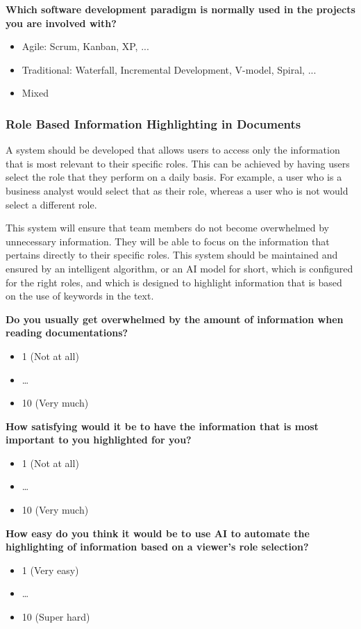 \textbf{Which software development paradigm is normally used in the projects you are involved with?}
\begin{itemize}
    \item Agile: Scrum, Kanban, XP, ...
    \item Traditional: Waterfall, Incremental Development, V-model, Spiral, ...
    \item Mixed
\end{itemize}

\subsubsection*{Role Based Information Highlighting in Documents}
A system should be developed that allows users to access only the information that is most relevant to their specific roles. This can be achieved by having users select the role that they perform on a daily basis. For example, a user who is a business analyst would select that as their role, whereas a user who is not would select a different role.

This system will ensure that team members do not become overwhelmed by unnecessary information. They will be able to focus on the information that pertains directly to their specific roles. This system should be maintained and ensured by an intelligent algorithm, or an AI model for short, which is configured for the right roles, and which is designed to highlight information that is based on the use of keywords in the text.

\textbf{Do you usually get overwhelmed by the amount of information when reading documentations?}
\begin{itemize}
    \item 1 (Not at all)
    \item \dots
    \item 10 (Very much)
\end{itemize}


\textbf{How satisfying would it be to have the information that is most important to you highlighted for you?}
\begin{itemize}
    \item 1 (Not at all)
    \item \dots
    \item 10 (Very much)
\end{itemize}

\textbf{How easy do you think it would be to use AI to automate the highlighting of information based on a viewer's role selection?}
\begin{itemize}
    \item 1 (Very easy)
    \item \dots
    \item 10 (Super hard)
\end{itemize}

